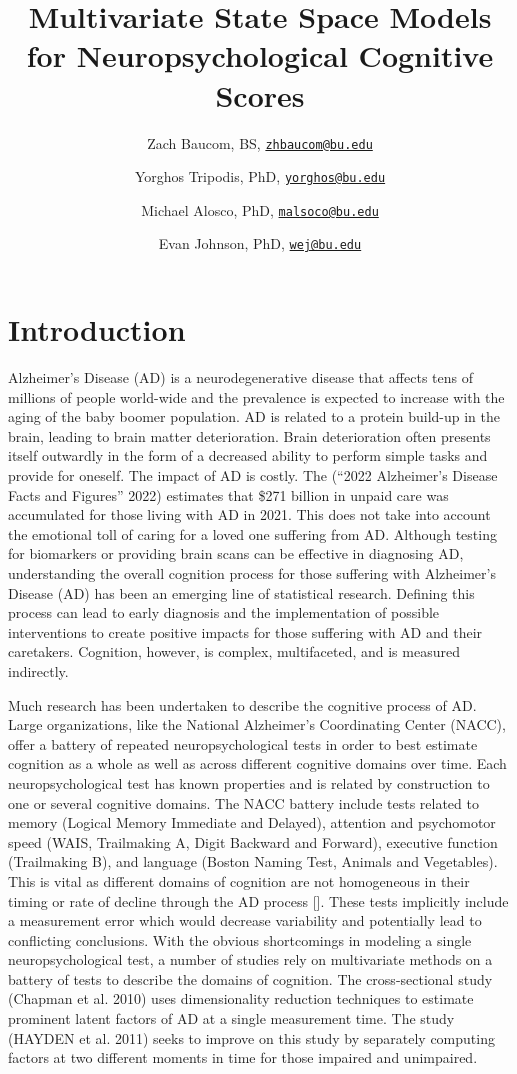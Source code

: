\documentclass[
]{article}
\title{Multivariate State Space Models for Neuropsychological Cognitive Scores}
\author{Zach Baucom, BS, \href{mailto:zhbaucom@bu.edu}{\nolinkurl{zhbaucom@bu.edu}} \and Yorghos Tripodis, PhD, \href{mailto:yorghos@bu.edu}{\nolinkurl{yorghos@bu.edu}} \and Michael Alosco, PhD, \href{mailto:malsoco@bu.edu}{\nolinkurl{malsoco@bu.edu}} \and Evan Johnson, PhD, \href{mailto:wej@bu.edu}{\nolinkurl{wej@bu.edu}}}
\date{}
\begin{document}
\maketitle

{
\setcounter{tocdepth}{2}
\tableofcontents
}
\newpage{}

\hypertarget{introduction}{%
\section{Introduction}\label{introduction}}

Alzheimer's Disease (AD) is a neurodegenerative disease that affects tens of millions of people world-wide and the prevalence is expected to increase with the aging of the baby boomer population. AD is related to a protein build-up in the brain, leading to brain matter deterioration. Brain deterioration often presents itself outwardly in the form of a decreased ability to perform simple tasks and provide for oneself. The impact of AD is costly. The ({``2022 Alzheimer's Disease Facts and Figures''} 2022) estimates that \$271 billion in unpaid care was accumulated for those living with AD in 2021. This does not take into account the emotional toll of caring for a loved one suffering from AD. Although testing for biomarkers or providing brain scans can be effective in diagnosing AD, understanding the overall cognition process for those suffering with Alzheimer's Disease (AD) has been an emerging line of statistical research. Defining this process can lead to early diagnosis and the implementation of possible interventions to create positive impacts for those suffering with AD and their caretakers. Cognition, however, is complex, multifaceted, and is measured indirectly.

Much research has been undertaken to describe the cognitive process of AD. Large organizations, like the National Alzheimer's Coordinating Center (NACC), offer a battery of repeated neuropsychological tests in order to best estimate cognition as a whole as well as across different cognitive domains over time. Each neuropsychological test has known properties and is related by construction to one or several cognitive domains. The NACC battery include tests related to memory (Logical Memory Immediate and Delayed), attention and psychomotor speed (WAIS, Trailmaking A, Digit Backward and Forward), executive function (Trailmaking B), and language (Boston Naming Test, Animals and Vegetables). This is vital as different domains of cognition are not homogeneous in their timing or rate of decline through the AD process {[}{]}. These tests implicitly include a measurement error which would decrease variability and potentially lead to conflicting conclusions. With the obvious shortcomings in modeling a single neuropsychological test, a number of studies rely on multivariate methods on a battery of tests to describe the domains of cognition. The cross-sectional study (Chapman et al. 2010) uses dimensionality reduction techniques to estimate prominent latent factors of AD at a single measurement time. The study (HAYDEN et al. 2011) seeks to improve on this study by separately computing factors at two different moments in time for those impaired and unimpaired.
\end{document}
